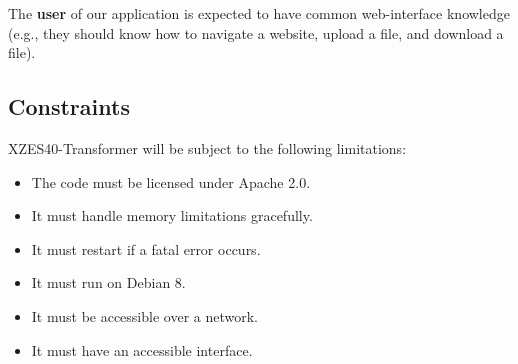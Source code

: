 The \textbf{user} of our application is expected to have common web-interface knowledge (e.g., they should know how to navigate a website, upload a file, and download a file).


\subsection{Constraints}
% 

XZES40-Transformer will be subject to the following limitations:

\begin{itemize}
  \item The code must be licensed under Apache 2.0.
  \item It must handle memory limitations gracefully.
  \item It must restart if a fatal error occurs.
  \item It must run on Debian 8.
  \item It must be accessible over a network.
  \item It must have an accessible interface.
\end{itemize}


